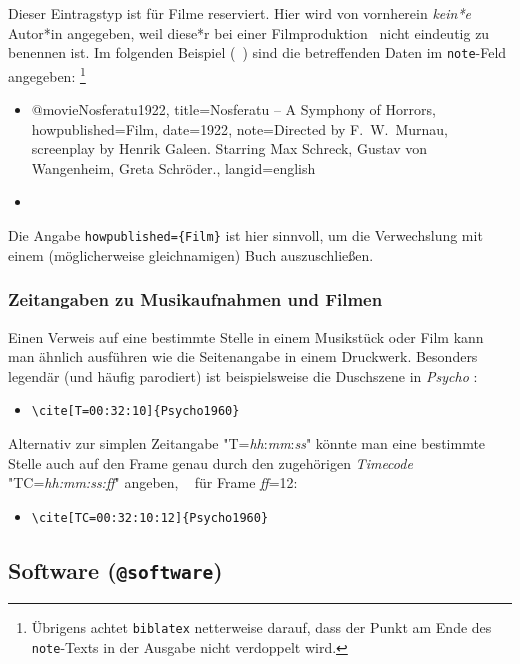 Dieser Eintragstyp ist für Filme reserviert. Hier wird von vornherein
\emph{kein*e} Autor*in angegeben, weil diese*r bei einer Filmproduktion \ia\
nicht eindeutig zu benennen ist. Im folgenden Beispiel (\sa\
\cite{Psycho1960}) sind die betreffenden Daten im \texttt{note}-Feld angegeben:%
\footnote{Übrigens achtet \texttt{biblatex} netterweise darauf, dass der
Punkt am Ende des \texttt{note}-Texts in der Ausgabe nicht verdoppelt wird.}
%
\begin{itemize}
\item[]
\begin{GenericCode}[numbers=none]
@movie{Nosferatu1922,
  title={Nosferatu -- A Symphony of Horrors},
  howpublished={Film},
  date={1922},
  note={Directed by F.\ W.\ Murnau, screenplay by Henrik Galeen. Starring Max Schreck, Gustav von Wangenheim, Greta Schröder.},
  langid={english}
}
\end{GenericCode}
\item[\cite{Nosferatu1922}] 
\end{itemize}
%
Die Angabe \verb!howpublished={Film}! ist hier sinnvoll, um die Verwechslung
mit einem (möglicherweise gleichnamigen) Buch auszuschließen.

\subsubsection{Zeitangaben zu Musikaufnahmen und Filmen}

Einen Verweis auf eine bestimmte Stelle in einem Musikstück oder Film kann
man ähnlich ausführen wie die Seitenangabe in einem Druckwerk. Besonders
legendär (und häufig parodiert) ist beispielsweise die Duschszene in
\emph{Psycho} \cite[T=00:32:10]{Psycho1960}:
%
\begin{itemize}
    \item[] \verb!\cite[T=00:32:10]{Psycho1960}!
\end{itemize}
%
Alternativ zur simplen Zeitangabe "T=\emph{hh}:\emph{mm}:\emph{ss}" könnte
man eine bestimmte Stelle auch auf den Frame genau durch den zugehörigen
\emph{Timecode} "TC=\emph{hh:mm:ss:ff}" angeben, \zB\
\cite[TC=00:32:10:12]{Psycho1960} für Frame \emph{ff}=12:
%
\begin{itemize}
    \item[] \verb!\cite[TC=00:32:10:12]{Psycho1960}!
\end{itemize}

\subsection{Software (\texttt{\bfseries @software})}
\label{sec:@software}

